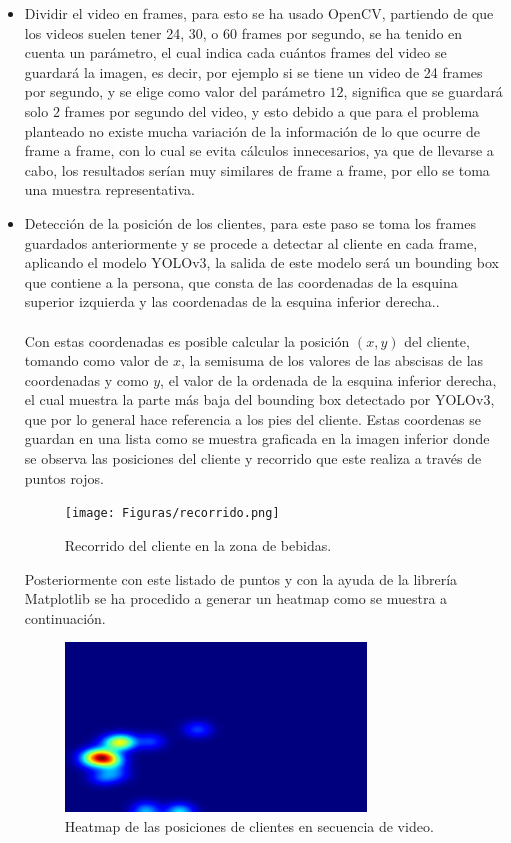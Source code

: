 \documentclass[conference]{IEEEtran}
\begin{document}
\begin{itemize}
\item Dividir el video en frames, para esto se ha usado OpenCV, partiendo de que los videos suelen tener 24, 30, o 60 frames por segundo, se ha tenido en cuenta un parámetro, el cual indica cada cuántos frames del video se guardará la imagen, es decir, por ejemplo si se tiene un video de 24 frames por segundo, y se elige como  valor del parámetro $12$, significa que se guardará solo $2$ frames por segundo del video, y esto debido a que para el problema planteado no existe mucha variación de la información de lo que ocurre de frame a frame, con lo cual se evita cálculos innecesarios, ya que de llevarse a cabo, los resultados serían muy similares de frame a frame, por ello se toma una muestra representativa.
\\
\item Detección de la posición de los clientes, para este paso se toma los frames guardados anteriormente y se procede a detectar al cliente en cada frame, aplicando el modelo YOLOv3, la salida de este modelo será un bounding box que contiene a la persona, que consta de las coordenadas de la esquina superior izquierda y las coordenadas de la esquina inferior derecha.. 
\\\\
Con estas coordenadas es posible calcular la posición $(x, y)$ del cliente, tomando como valor de $x$, la semisuma de los valores de las abscisas de las coordenadas y como $y$, el valor de la ordenada de la esquina inferior derecha, el cual muestra la parte más baja del bounding box detectado por YOLOv3, que por lo general hace referencia a los pies del cliente. Estas coordenas se guardan en una lista como se muestra  graficada en la imagen inferior donde se observa las posiciones del cliente y recorrido que este realiza a través de puntos rojos.

\begin{figure}[hbtp!]
\centering
\texttt{[image: Figuras/recorrido.png]}
\caption{Recorrido del cliente en la zona de bebidas.}
\label{fig:recorrido}
\end{figure}

Posteriormente con este listado de puntos y con la ayuda de la librería Matplotlib se ha procedido a generar un heatmap como se muestra  a continuación.

\begin{figure}[hbtp]
\centering
\includegraphics[width=8cm]{../Recursos/video1/video1_yolo_output_heatmap.jpg}
\caption{Heatmap de las posiciones de clientes en secuencia de video.}
\label{fig:video1_yolo_output_heatmap}
\end{figure}


\end{itemize}
\end{document}
